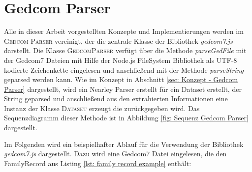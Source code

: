 \section{Gedcom Parser}
\label{sec: Implementierung - Gedcom Parser}
Alle in dieser Arbeit vorgestellten Konzepte und Implementierungen werden im \textsc{Gedcom Parser} vereinigt, der die zentrale Klasse der Bibliothek \textit{gedcom7.js} darstellt. Die Klasse \textsc{GedcomParser} verfügt über die Methode \textit{parseGedFile} mit der Gedcom7 Dateien mit Hilfe der Node.js FileSystem Bibliothek als UTF-8 kodierte Zeichenkette eingelesen und anschließend mit der Methode \textit{parseString} geparsed werden kann. Wie im Konzept in Abschnitt \ref{sec: Konzept - Gedcom Parser} dargestellt, wird ein Nearley Parser erstellt für ein Dataset erstellt, der String geparsed und anschließend aus den extrahierten Informationen eine Instanz der Klasse \textsc{Dataset} erzeugt die zurückgegeben wird. Das Sequenzdiagramm dieser Methode ist in Abbildung \ref{fig: Sequenz Gedcom Parser} dargestellt.


Im Folgenden wird ein beispielhafter Ablauf für die Verwendung der Bibliothek \textit{gedcom7.js} dargestellt. Dazu wird eine Gedcom7 Datei eingelesen, die den FamilyRecord aus Listing \ref{lst: family record example} enthält:

